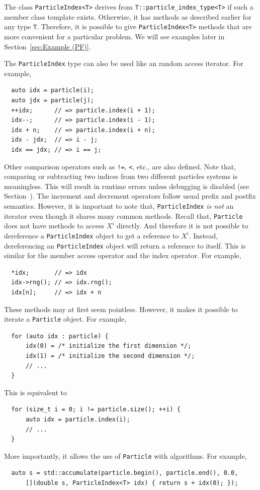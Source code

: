 The class \verb|ParticleIndex<T>| derives from \verb|T::particle_index_type<T>|
if such a member class template exists. Otherwise, it has methods as described
earlier for any type \verb|T|. Therefore, it is possible to give
\verb|ParticleIndex<T>| methods that are more convenient for a particular
problem. We will see examples later in Section~\ref{sec:Example (PF)}.

The \verb|ParticleIndex| type can also be used like an random access iterator.
For example,
\begin{Verbatim}
  auto idx = particle(i);
  auto jdx = particle(j);
  ++idx;      // => particle.index(i + 1);
  idx--;      // => particle.index(i - 1);
  idx + n;    // => particle.index(i + n);
  idx - jdx;  // => i - j;
  idx == jdx; // => i == j;
\end{Verbatim}
Other comparison operators such as \verb|!=|, \verb|<|, etc., are also
defined. Note that, comparing or subtracting two indices from two different
particles systems is meaningless. This will result in runtime errors unless
debugging is disabled (see Section~). The increment
and decrement operators follow usual \cpp prefix and postfix semantics.
However, it is important to note that, \verb|ParticleIndex| \emph{is not} an
iterator even though it shares many common methods. Recall that,
\verb|Particle| does not have methods to access $X^i$ directly. And therefore
it is not possible to dereference a \verb|ParticleIndex| object to get a
reference to $X^i$. Instead, dereferencing an \verb|ParticleIndex| object will
return a reference to itself. This is similar for the member access operator
and the index operator. For example,
\begin{Verbatim}
  *idx;       // => idx
  idx->rng(); // => idx.rng();
  idx[n];     // => idx + n
\end{Verbatim}
These methods may at first seem pointless. However, it makes it possible to
iterate a \verb|Particle| object. For example,
\begin{Verbatim}
  for (auto idx : particle) {
      idx(0) = /* initialize the first dimension */;
      idx(1) = /* initialize the second dimension */;
      // ...
  }
\end{Verbatim}
This is equivalent to
\begin{Verbatim}
  for (size_t i = 0; i != particle.size(); ++i) {
      auto idx = particle.index(i);
      // ...
  }
\end{Verbatim}
More importantly, it allows the use of \verb|Particle| with algorithms. For
example,
\begin{Verbatim}
  auto s = std::accumulate(particle.begin(), particle.end(), 0.0,
      [](double s, ParticleIndex<T> idx) { return s + idx(0); });
\end{Verbatim}

